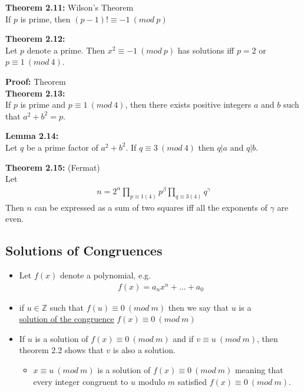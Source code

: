 \documentclass[a4paper]{article}
\begin{document}
\textbf{Theorem 2.11:} Wilson's Theorem\\
If $p$ is prime, then $(p-1)!\equiv -1\ (mod\ p)$

\textbf{Theorem 2.12:}\\
Let $p$ denote a prime. Then $x^2\equiv -1\ (mod\ p)$ has solutions iff
$p=2$ or $p\equiv 1\ (mod\ 4)$.


\textbf{Proof:} Theorem \\

\textbf{Theorem 2.13:}\\
If $p$ is prime and $p\equiv 1\ (mod\ 4)$, then there exists positive integers
$a$ and $b$ such that $a^2+b^2=p$.


\textbf{Lemma 2.14:}\\
Let $q$ be a prime factor of $a^2+b^2$.
If $q\equiv 3\ (mod\ 4)$ then $q|a$ and $q|b$.


\textbf{Theorem 2.15:} (Fermat)\\
Let
\begin{align}
    n =  2^\alpha\prod_{p\equiv 1(4)}p^\beta\prod_{q\equiv 3(4)}q^\gamma
\end{align}
Then $n$ can be expressed as a sum of two squares iff all the exponents of
$\gamma$ are even.

\subsection{Solutions of Congruences}
\begin{itemize}
    \item Let $f(x)$ denote a polynomial, e.g.
    \begin{align}
        f(x)=a_nx^n+...+a_0
    \end{align}
    \item if $u\in\mathbb{Z}$ such that $f(u)\equiv0\ (mod\ m)$ then we say
    that $u$ is a\\ \underline{solution of the congruence} $f(x)\equiv0\ (mod\ m)$
    \item If $u$ is a solution of $f(x)\equiv0\ (mod\ m)$ and if
    $v\equiv u\ (mod\ m)$, then theorem 2.2 shows that $v$ is also a solution.
    \begin{itemize}
        \item $x\equiv u\ (mod\ m)$ is a solution of $f(x)\equiv0\ (mod\ m)$
        meaning that every integer congruent to $u$ modulo $m$ satisfied
        $f(x)\equiv0\ (mod\ m)$.
    \end{itemize}
\end{itemize}
\end{document}
